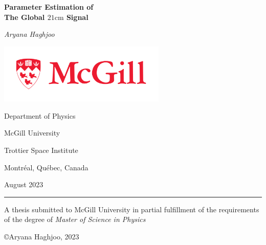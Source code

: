 \documentclass[12pt, TexShade, letterpaper]{report}
\author{\textcopyright Author, August, 2020}
\date{}
\renewcommand{\chaptermark}[1]{\markboth{#1}{}} %
\begin{document}
\begin{titlepage}
		\begin{center}
			\vspace*{0.5cm}

			\LARGE
			\textbf{Parameter Estimation of \\
   The Global $\mathrm{21cm}$ Signal}
			\vspace{0.5cm}
			
			\textit{Aryana Haghjoo}
			
			\vspace{0.5cm}
			
			\includegraphics[width=0.6\textwidth]{McGill_logo.png}
			
			\vspace{0.05cm}
			
			\Large
			Department of Physics
			
			\vspace{-6mm}
			McGill University
			
			\vspace{-6mm}
			Trottier Space Institute
			
			\vspace{-6mm}
			Montr\'eal, Qu\'ebec, Canada
			
			\vspace{5mm}
			August 2023
			\small
			\vspace{1cm}
			{\color{red} \hrule height 0.75mm}
			
			\vspace{0.2cm}
			
			A thesis submitted to McGill University in partial fulfillment of the requirements of the degree of
			\emph{Master of Science in Physics}
		
			\copyright\hspace{0.5mm}Aryana Haghjoo, 2023
			
		\end{center}
	\end{titlepage}
\setlength{\voffset}{2cm}
\renewcommand{\chaptermark}[1]{%
	\markboth{\thechapter.\ #1}{}}
\end{document}
